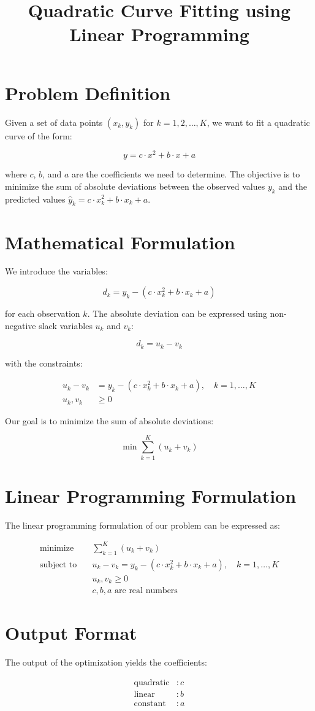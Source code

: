 \documentclass{article}
\begin{document}
\title{Quadratic Curve Fitting using Linear Programming}
\author{}
\date{}
\maketitle

\section*{Problem Definition}

Given a set of data points $(x_k, y_k)$ for $k = 1, 2, \ldots, K$, we want to fit a quadratic curve of the form:

\[
y = c \cdot x^2 + b \cdot x + a
\]

where \(c\), \(b\), and \(a\) are the coefficients we need to determine. The objective is to minimize the sum of absolute deviations between the observed values \(y_k\) and the predicted values \(\hat{y}_k = c \cdot x_k^2 + b \cdot x_k + a\).

\section*{Mathematical Formulation}

We introduce the variables:

\[
d_k = y_k - (c \cdot x_k^2 + b \cdot x_k + a)
\]

for each observation \(k\). The absolute deviation can be expressed using non-negative slack variables \(u_k\) and \(v_k\):

\[
d_k = u_k - v_k
\]

with the constraints:

\[
\begin{align*}
u_k - v_k &= y_k - (c \cdot x_k^2 + b \cdot x_k + a), \quad k = 1, \ldots, K \\
u_k, v_k &\geq 0
\end{align*}
\]

Our goal is to minimize the sum of absolute deviations:

\[
\min \sum_{k=1}^{K} (u_k + v_k)
\]

\section*{Linear Programming Formulation}

The linear programming formulation of our problem can be expressed as:

\[
\begin{align*}
\text{minimize} \quad & \sum_{k=1}^{K} (u_k + v_k) \\
\text{subject to} \quad & u_k - v_k = y_k - (c \cdot x_k^2 + b \cdot x_k + a), \quad k = 1, \ldots, K \\
& u_k, v_k \geq 0 \\
& c, b, a \text{ are real numbers}
\end{align*}
\]

\section*{Output Format}

The output of the optimization yields the coefficients:

\[
\begin{align*}
\text{quadratic} & : c \\
\text{linear} & : b \\
\text{constant} & : a
\end{align*}
\]
\end{document}
